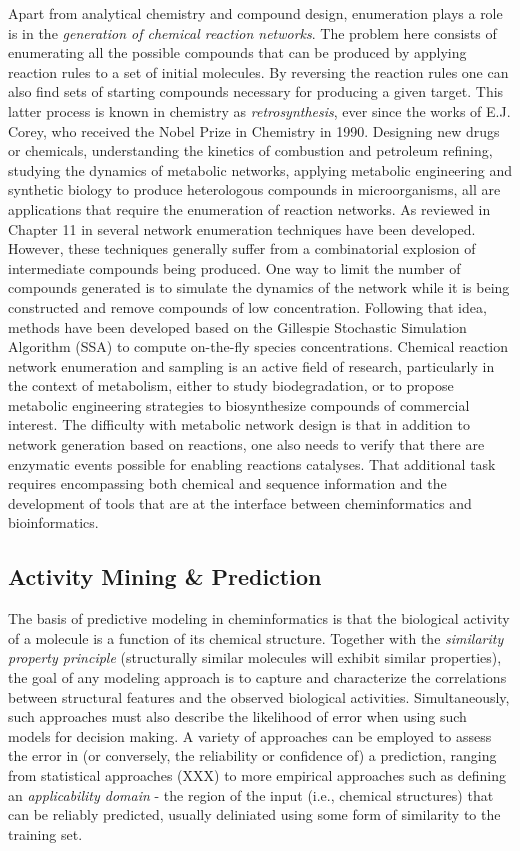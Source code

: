\documentclass{sig-alternate}
\begin{document}
Apart from analytical chemistry and compound design, enumeration plays
a role is in the \emph{generation of chemical reaction networks}. The
problem here consists of enumerating all the possible compounds that
can be produced by applying reaction rules to a set of initial
molecules. By reversing the reaction rules one can also find sets of
starting compounds necessary for producing a given target. This latter
process is known in chemistry as \emph{retrosynthesis}, ever since the
works of E.J. Corey, who received the Nobel Prize in Chemistry in
1990. Designing new drugs or chemicals, understanding the kinetics of
combustion and petroleum refining, studying the dynamics of metabolic
networks, applying metabolic engineering and synthetic biology to
produce heterologous compounds in microorganisms, all are applications
that require the enumeration of reaction networks. As reviewed in
Chapter 11 in \cite{faulon2010} several network enumeration techniques
have been developed. However, these techniques generally suffer from a
combinatorial explosion of intermediate compounds being produced. One
way to limit the number of compounds generated is to simulate the
dynamics of the network while it is being constructed and remove
compounds of low concentration. Following that idea, methods have been
developed based on the Gillespie Stochastic Simulation Algorithm (SSA)
to compute on-the-fly species concentrations. Chemical reaction
network enumeration and sampling is an active field of research,
particularly in the context of metabolism, either to study
biodegradation, or to propose metabolic engineering strategies to
biosynthesize compounds of commercial interest. The difficulty with
metabolic network design is that in addition to network generation
based on reactions, one also needs to verify that there are enzymatic
events possible for enabling reactions catalyses. That additional task
requires encompassing both chemical and sequence information and the
development of tools that are at the interface between cheminformatics
and bioinformatics.

\subsection{Activity Mining \& Prediction}
\label{sec:activity-mining}


The basis of predictive modeling in cheminformatics is that the
biological activity of a molecule is a function of its chemical
structure. Together with the \emph{similarity property principle}
\cite{Johnson:1990qf} (structurally similar molecules will exhibit  
similar properties), the goal of any modeling approach is to capture
and characterize the correlations between structural features and the
observed biological activities. Simultaneously, such approaches must
also describe the likelihood of error when using such
models for decision making.  A variety of approaches can be employed
to assess the error in (or conversely, the reliability or confidence of) a
prediction, ranging from statistical approaches (XXX) to more
empirical approaches such as defining an \emph{applicability domain} -
the region of the input (i.e., chemical structures) that can be
reliably predicted, usually deliniated using some form of similarity
to the training set.
\end{document}
